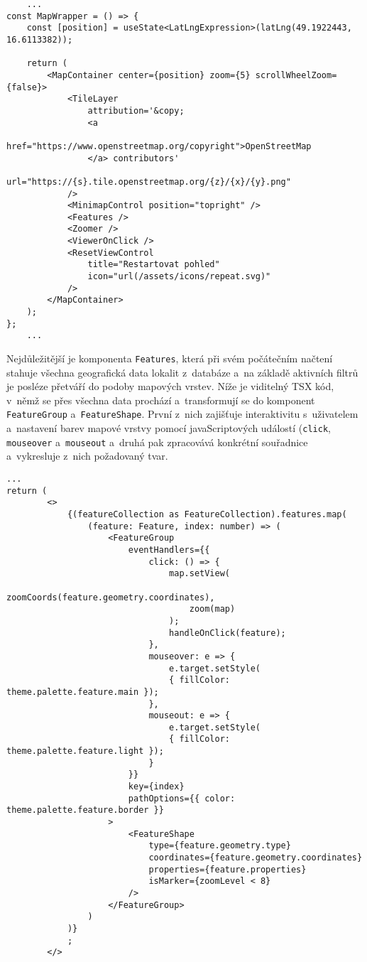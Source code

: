 \begin{verbatim}
    ...
const MapWrapper = () => {
    const [position] = useState<LatLngExpression>(latLng(49.1922443, 16.6113382));

    return (
        <MapContainer center={position} zoom={5} scrollWheelZoom={false}>
            <TileLayer
                attribution='&copy;
                <a
                href="https://www.openstreetmap.org/copyright">OpenStreetMap
                </a> contributors'
                url="https://{s}.tile.openstreetmap.org/{z}/{x}/{y}.png"
            />
            <MinimapControl position="topright" />
            <Features />
            <Zoomer />
            <ViewerOnClick />
            <ResetViewControl
                title="Restartovat pohled"
                icon="url(/assets/icons/repeat.svg)"
            />
        </MapContainer>
    );
};
    ...
    \end{verbatim}

Nejdůležitější je komponenta \verb|Features|, která při svém počátečním načtení stahuje všechna geografická data lokalit z~databáze a~na základě aktivních filtrů je posléze přetváří do podoby mapových vrstev. Níže je viditelný TSX kód, v~němž se přes všechna data prochází a~transformují se do komponent \verb|FeatureGroup| a~\verb|FeatureShape|. První z~nich zajišťuje interaktivitu s~uživatelem a~nastavení barev mapové vrstvy pomocí javaScriptových událostí (\verb|click|, \verb|mouseover| a~\verb|mouseout| a~druhá pak zpracovává konkrétní souřadnice a~vykresluje z~nich požadovaný tvar.

\begin{verbatim}
...
return (
        <>
            {(featureCollection as FeatureCollection).features.map(
                (feature: Feature, index: number) => (
                    <FeatureGroup
                        eventHandlers={{
                            click: () => {
                                map.setView(
                                    zoomCoords(feature.geometry.coordinates),
                                    zoom(map)
                                );
                                handleOnClick(feature);
                            },
                            mouseover: e => {
                                e.target.setStyle(
                                { fillColor: theme.palette.feature.main });
                            },
                            mouseout: e => {
                                e.target.setStyle(
                                { fillColor: theme.palette.feature.light });
                            }
                        }}
                        key={index}
                        pathOptions={{ color: theme.palette.feature.border }}
                    >
                        <FeatureShape
                            type={feature.geometry.type}
                            coordinates={feature.geometry.coordinates}
                            properties={feature.properties}
                            isMarker={zoomLevel < 8}
                        />
                    </FeatureGroup>
                )
            )}
            ;
        </>
    \end{verbatim}
